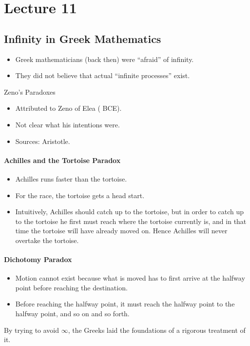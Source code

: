 \documentclass[class=article, crop=false]{standalone}
\begin{document}
  \section{Lecture 11}
  \subsection{Infinity in Greek Mathematics}
  \begin{itemize}
    \item Greek mathematicians (back then) were ``afraid'' of infinity.
    \item They did not believe that actual ``infinite processes''  exist.
  \end{itemize}
  \begin{example}{Zeno's Paradoxes}
    \begin{itemize}
      \item Attributed to Zeno of Elea ( BCE).
      \item Not clear what his intentions were.
      \item Sources: Aristotle.
    \end{itemize}
    \paragraph{Achilles and the Tortoise Paradox}
    \begin{itemize}
      \item Achilles runs faster than the tortoise.
      \item For the race, the tortoise gets a head start.
      \item Intuitively, Achilles should catch up to the tortoise, but in order to catch up to the tortoise he first must reach where the tortoise currently is, and in that time the tortoise will have already moved on. Hence Achilles will never overtake the tortoise.
    \end{itemize}
    \paragraph{Dichotomy Paradox}
    \begin{itemize}
      \item Motion cannot exist because what is moved has to first arrive at the halfway point before reaching the destination.
      \item Before reaching the halfway point, it must reach the halfway point to the halfway point, and so on and so forth.
    \end{itemize}
  \end{example}
  \begin{note}{}
    By trying to avoid $\infty$, the Greeks laid the foundations of a rigorous treatment of it.
  \end{note}
\end{document}
